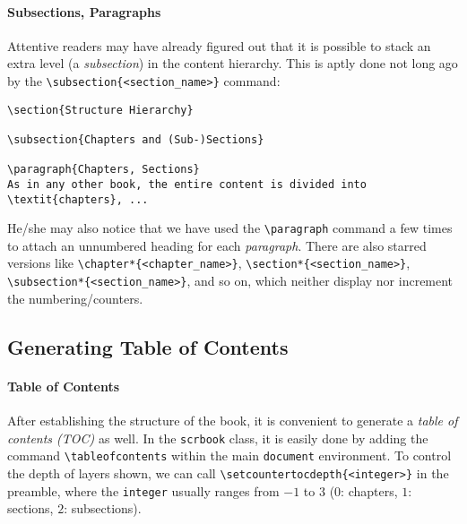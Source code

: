 \paragraph{Subsections, Paragraphs}
Attentive readers may have already figured out that it is possible to stack an extra level (a \textit{subsection}) in the content hierarchy. This is aptly done not long ago by the \texttt{\textbackslash subsection\{<section\_name>\}} command:
\begin{lstlisting}
\section{Structure Hierarchy}

\subsection{Chapters and (Sub-)Sections}

\paragraph{Chapters, Sections}
As in any other book, the entire content is divided into \textit{chapters}, ...
\end{lstlisting}
He/she may also notice that we have used the \texttt{\textbackslash paragraph} command a few times to attach an unnumbered heading for each \textit{paragraph}. There are also starred versions like \texttt{\textbackslash chapter*\{<chapter\_name>\}}, \texttt{\textbackslash section*\{<section\_name>\}}, \texttt{\textbackslash subsection*\{<section\_name>\}}, and so on, which neither display nor increment the numbering/counters.

\subsection{Generating Table of Contents}

\paragraph{Table of Contents}
After establishing the structure of the book, it is convenient to generate a \textit{table of contents (TOC)} as well. In the \verb|scrbook| class, it is easily done by adding the command \texttt{\textbackslash tableofcontents} within the main \verb|document| environment. To control the depth of layers shown, we can call \texttt{\textbackslash setcounter{tocdepth}\allowbreak\{<integer>\}} in the preamble, where the \verb|integer| usually ranges from $-1$ to $3$ ($0$: chapters, $1$: sections, $2$: subsections).

